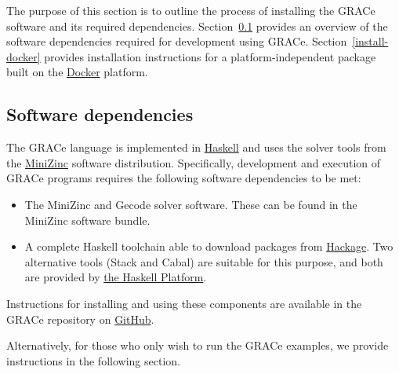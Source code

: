 

The purpose of this section is to outline the process of installing
the GRACe software and its required dependencies.
%
Section~\ref{install-overview} provides an overview of the software
dependencies required for development using GRACe.
%
Section~\ref{install-docker} provides installation instructions for a
platform-independent package built on the
\href{https://www.docker.com/}{Docker} platform.


\subsection{Software dependencies}
\label{install-overview}

The GRACe language is implemented in
\href{https://www.haskell.org/}{Haskell} and uses the solver tools
from the \href{http://www.minizinc.org/}{MiniZinc} software
distribution.
%
Specifically, development and execution of GRACe programs requires the
following software dependencies to be met:

\begin{itemize}
\item The MiniZinc and Gecode solver software.
%
  These can be found in the MiniZinc software bundle.
%
\item A complete Haskell toolchain able to download packages from
  \href{https://hackage.haskell.org/}{Hackage}.
%
  Two alternative tools (Stack and Cabal) are suitable for this
  purpose, and both are provided by
  \href{https://www.haskell.org/platform/}{the Haskell Platform}.
\end{itemize}

Instructions for installing and using these components are available
in the {GRACe} repository on
\href{https://github.com/GRACeFUL-project/%
  GRACe/blob/master/doc/INSTALL.md}{GitHub}.

%
Alternatively, for those who only wish to run the GRACe
examples, we provide instructions in the following section.


